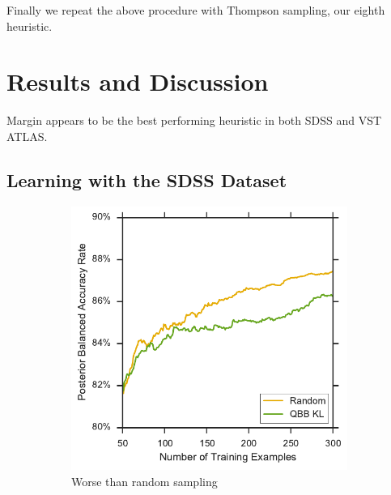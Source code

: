 Finally we repeat the above procedure with Thompson sampling, our eighth heuristic.


\section{Results and Discussion}
\label{sec:results2}
Margin appears to be the best performing heuristic in both SDSS and VST ATLAS.

\subsection{Learning with the SDSS Dataset}



\begin{figure}[p]
	\centering
	\begin{subfigure}{.5\textwidth}
		\centering
		\includegraphics[width=0.99\textwidth]{figures/5_active/sdss_bl_ind_lower}
		\caption{Worse than random sampling}
		\label{fig:sdss_bl_ind_lower}
	\end{subfigure}%
	\begin{subfigure}{.5\textwidth}
		\centering

\end{subfigure}
\end{figure}
